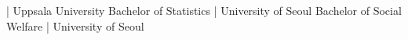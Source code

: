 %
%
%


\begin{scholarship}
					{ | Uppsala University}
					{Bachelor of Statistics | University of Seoul}
					{Bachelor of Social Welfare | University of Seoul}
\end{scholarship}